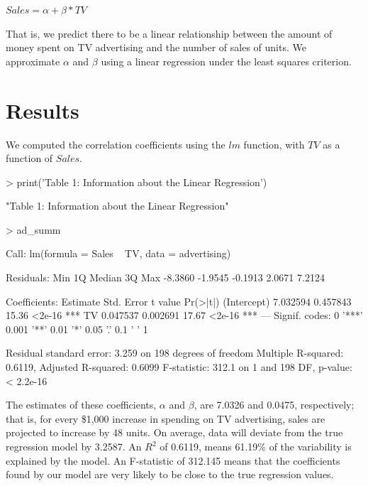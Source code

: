 \documentclass{report}
\begin{document}
  $Sales = \alpha + \beta * TV$


That is, we predict there to be a linear relationship between the amount of money spent on TV advertising and the number of sales of units. We approximate $\alpha$ and $\beta$ using a linear regression under the least squares criterion.


\section*{Results}
We computed the correlation coefficients using the $lm$ function, with $TV$ as a function of $Sales$.

\begin{Schunk}
\begin{Sinput}
> print('Table 1: Information about the Linear Regression')
\end{Sinput}
\begin{Soutput}
[1] "Table 1: Information about the Linear Regression"
\end{Soutput}
\begin{Sinput}
> ad_summ
\end{Sinput}
\begin{Soutput}
Call:
lm(formula = Sales ~ TV, data = advertising)

Residuals:
    Min      1Q  Median      3Q     Max 
-8.3860 -1.9545 -0.1913  2.0671  7.2124 

Coefficients:
            Estimate Std. Error t value Pr(>|t|)    
(Intercept) 7.032594   0.457843   15.36   <2e-16 ***
TV          0.047537   0.002691   17.67   <2e-16 ***
---
Signif. codes:  0 '***' 0.001 '**' 0.01 '*' 0.05 '.' 0.1 ' ' 1

Residual standard error: 3.259 on 198 degrees of freedom
Multiple R-squared:  0.6119,	Adjusted R-squared:  0.6099 
F-statistic: 312.1 on 1 and 198 DF,  p-value: < 2.2e-16
\end{Soutput}
\end{Schunk}

The estimates of these coefficients, $\alpha$ and $\beta$, are 7.0326 and 0.0475, respectively; that is, for every \$1,000 increase in spending
on TV advertising, sales are projected to increase by 48 units. On average, data will deviate from the true regression model by 3.2587. An $R^2$ of 0.6119, means 61.19\% of the variability is explained by the model. An F-statistic of 312.145 means that the coefficients found by our model are very likely to be close to the true regression values.
\end{document}
